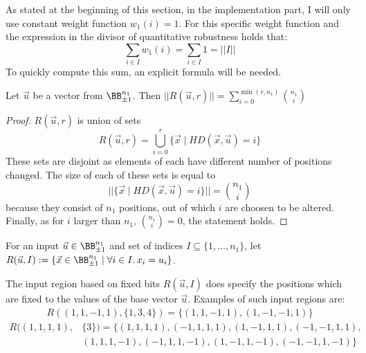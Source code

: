 As stated at the beginning of this section, in the implementation part,
I will only use constant weight function $w_1(i) = 1$. For this specific
weight function and the expression in the divisor of quantitative robustness
holds that:
\[\sum_{i\in I} w_1(i) = \sum_{i\in I} 1 = ||I||\]
To quickly compute this sum, an explicit formula will be needed.\pagebreak

\begin{lemma}{Let $\vec u$ be a vector from $\BB^{n_1}_{\pm 1}$.
    Then $||R(\vec u, r)|| = \sum_{i=0}^{\min(r, n_1)} {n_1\choose i}$}%
    \label{lemma:size_of_hamming}%
    \begin{proof}
        $R(\vec u, r)$ is union of sets
        \begin{equation*}
            R(\vec u, r) = \bigcup_{i=0}^{r} \{\vec x \mid HD(\vec x, \vec u) = i\}
        \end{equation*}
        These sets are disjoint as elements of each have different number
        of positions changed. The size of each of these sets is equal to
        \begin{equation*}
            ||\{\vec x \mid HD(\vec x, \vec u) = i\}|| = {n_1\choose i}
        \end{equation*}
        because they consist of $n_1$ positions, out of which $i$ are choosen to be altered.
        Finally, as for $i$ larger than $n_1$, ${n_1\choose i}=0$, the statement holds.
    \end{proof}
\end{lemma}

\begin{definition}
    For an input $\vec u\in \BB^{n_1}_{\pm 1}$ and set of indices $I \subseteq \{1,\ldots,n_1\}$, let
    $R(\vec u, I) := \{\vec x\in \BB^{n_1}_{\pm 1} \mid \forall i\in I.\, x_i = u_i \}$.
\end{definition}

The input region based on fixed bits $R(\vec u, I)$ does specify
the positions which are fixed to the values of the base vector $\vec u$.
Examples of such input regions are:
\begin{align*}
    R((1,1,-1,1), \{1,3,4\}) = \{(1,1,-1,1), (1,-1,-1,1)\}
\end{align*}
\begin{align*}
    R((1,1,1,1), &\{3\}) = \{(1,1,1,1), (-1,1,1,1), (1,-1,1,1), (-1,-1,1,1),\\
    &(1,1,1,-1), (-1,1,1,-1), (1,-1,1,-1), (-1,-1,1,-1)\}\\
\end{align*}

